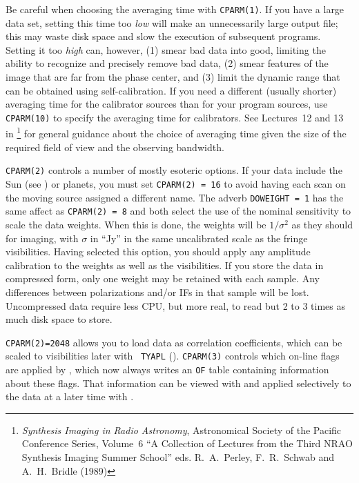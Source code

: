       Be careful when choosing the averaging time with {\tt CPARM(1)}.
If you have a large data set, setting this time too {\it low\/} will
make an unnecessarily large output file; this may waste disk space
and slow the execution of subsequent programs.  Setting it too {\it
high\/} can, however, (1) smear bad data into good, limiting the
ability to recognize and precisely remove bad data, (2) smear features
of the image that are far from the phase center, and (3) limit the
dynamic range that can be obtained using self-calibration.  If you
need a different (usually shorter) averaging time for the calibrator
sources than for your program sources, use {\tt CPARM(10)} to specify
the averaging time for calibrators.  See Lectures~12  and 13 in
{\it {}\/}\footnote{{\it
Synthesis Imaging in Radio Astronomy\/}, Astronomical Society of the
Pacific Conference Series, Volume~6 ``A Collection of Lectures from
the Third NRAO Synthesis Imaging Summer School'' eds.\/ R.\ A.\
Perley, F.\ R.\ Schwab and A.\ H.\ Bridle (1989)} for general guidance
about the choice of averaging time given the size of the required
field of view and the observing bandwidth.

     {\tt CPARM(2)} controls a number of mostly esoteric options.  If
your data include the Sun (see \Sec{oldsuncal}) or planets, you must
set {\tt CPARM(2) = 16} to avoid having each scan on the moving source
assigned a different name.  The adverb {\tt DOWEIGHT = 1} has the same
affect as {\tt CPARM(2) = 8} and both select the use of the nominal
sensitivity to scale the data weights.  When this is done, the weights
will be $1/\sigma^2$ as they should for imaging, with $\sigma$ in
``Jy'' in the same uncalibrated scale as the fringe visibilities.
Having selected this option, you should apply any amplitude
calibration to the weights as well as the visibilities.  If you store
the data in compressed form, only one weight may be retained with each
sample. Any differences between polarizations and/or IFs in that
sample will be lost.  Uncompressed data require less CPU, but more
real, to read but 2 to 3 times as much disk space to store.

      {\tt CPARM(2)=2048} allows you to load data as correlation
coefficients, which can be scaled to visibilities later with {\tt
TYAPL} (\Sec{oldVLATY}).  {\tt CPARM(3)} controls which on-line flags
are applied by {\tt \Tndx{FILLM}}, which now always writes an {\tt OF}
table containing information about these flags.  That information can
be viewed with {\tt \Tndx{PRTOF}} and applied selectively to the data
at a later time with {\tt \Tndx{OFLAG}}\@.

